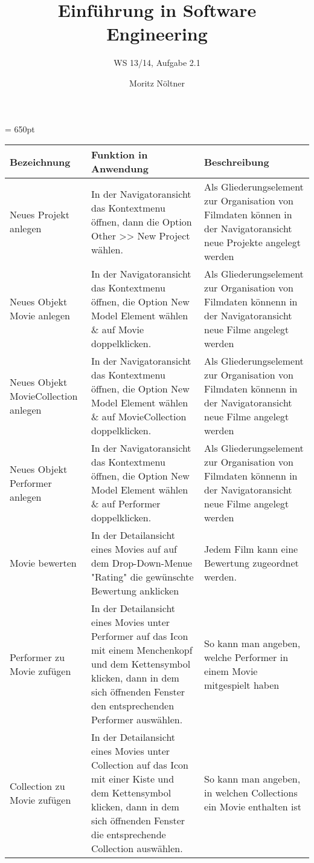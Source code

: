 \documentclass[ngerman, landscape]{scrartcl}
\begin{document}
\author{Moritz Nöltner}
\title{Einführung in Software Engineering}
\subtitle{WS 13/14, Aufgabe 2.1}
\maketitle


\textheight = 650pt
\begin{longtable}{|p{8cm}|p{8cm}|p{8cm}|}
	\hline
	\textbf{Bezeichnung} & \textbf{Funktion in Anwendung} & \textbf{Beschreibung} \\
	\hline
	\hline
	Neues Projekt anlegen & In der Navigatoransicht das Kontextmenu öffnen, dann die Option Other >>  New Project wählen. & Als Gliederungselement zur Organisation von Filmdaten können in der Navigatoransicht neue Projekte angelegt werden \\
	\hline
	Neues Objekt Movie anlegen & In der Navigatoransicht das Kontextmenu öffnen, die Option New Model Element wählen \& auf Movie doppelklicken. & Als Gliederungselement zur Organisation von Filmdaten könnenn in der Navigatoransicht neue Filme angelegt werden \\
	\hline
	Neues Objekt MovieCollection anlegen & In der Navigatoransicht das Kontextmenu öffnen, die Option New Model Element wählen \& auf MovieCollection doppelklicken. & Als Gliederungselement zur Organisation von Filmdaten könnenn in der Navigatoransicht neue Filme angelegt werden \\
	\hline
	Neues Objekt Performer anlegen & In der Navigatoransicht das Kontextmenu öffnen, die Option New Model Element wählen \& auf Performer doppelklicken. & Als Gliederungselement zur Organisation von Filmdaten könnenn in der Navigatoransicht neue Filme angelegt werden \\
	\hline
	Movie bewerten & In der Detailansicht eines Movies auf auf dem Drop-Down-Menue "Rating" die gewünschte Bewertung anklicken & Jedem Film  kann eine Bewertung zugeordnet werden. \\
	\hline
	Performer zu Movie zufügen & In der Detailansicht eines Movies unter Performer auf das Icon mit einem Menchenkopf und dem Kettensymbol klicken, dann in dem sich öffnenden Fenster den entsprechenden Performer auswählen. & So kann man angeben, welche Performer in einem Movie mitgespielt haben \\
	\hline
	Collection zu Movie zufügen & In der Detailansicht eines Movies unter Collection auf das Icon mit einer Kiste und dem Kettensymbol klicken, dann in dem sich öffnenden Fenster die entsprechende Collection auswählen. & So kann man angeben, in welchen Collections ein Movie enthalten ist \\

\end{longtable}
\end{document}
